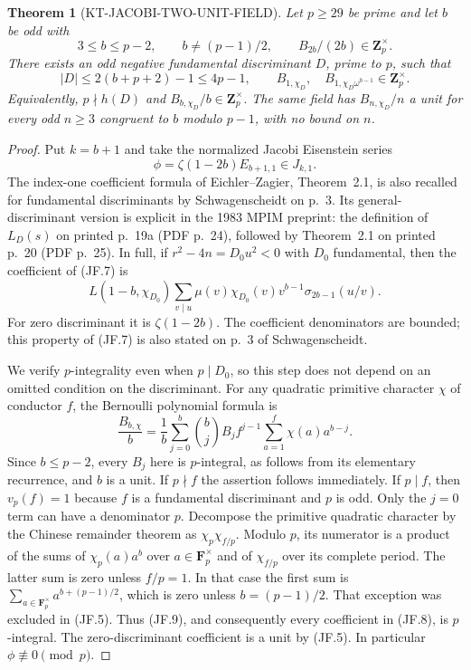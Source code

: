 \documentclass[11pt,a4paper]{article}
\newtheorem{theorem}{Theorem}[section]
\theoremstyle{definition}
\begin{document}
\begin{theorem}[KT-JACOBI-TWO-UNIT-FIELD]
Let $p\geq29$ be prime and let $b$ be odd with
\[
 3\leq b\leq p-2,\qquad b\ne(p-1)/2,
 \qquad B_{2b}/(2b)\in\mathbf Z_p^\times.               \tag{JF.5}
\]
There exists an odd negative fundamental discriminant $D$, prime to
$p$, such that
\[
 |D|\leq2(b+p+2)-1\leq4p-1,\qquad
 B_{1,\chi_D},\quad B_{1,\chi_D\omega^{b-1}}
                      \in\mathbf Z_p^\times.           \tag{JF.6}
\]
Equivalently, $p\nmid h(D)$ and
$B_{b,\chi_D}/b\in\mathbf Z_p^\times$.
The same field has $B_{n,\chi_D}/n$ a unit for every odd $n\geq3$
congruent to $b$ modulo $p-1$, with no bound on $n$.
\end{theorem}
\begin{proof}
Put $k=b+1$ and take the normalized Jacobi Eisenstein series
\[
                \phi=\zeta(1-2b)E_{b+1,1}\in J_{k,1}.
                                                               \tag{JF.7}
\]
The index-one coefficient formula of Eichler--Zagier, Theorem~2.1,
is also recalled for fundamental discriminants by Schwagenscheidt
on p.~3.  Its general-discriminant version is explicit in the
1983 MPIM preprint: the definition of $L_D(s)$ on printed p.~19a
(PDF p.~24), followed by Theorem~2.1 on printed p.~20 (PDF p.~25).
In full, if $r^2-4n=D_0u^2<0$ with $D_0$ fundamental,
then the coefficient of (JF.7) is
\[
 L(1-b,\chi_{D_0})
 \sum_{v\mid u}\mu(v)\chi_{D_0}(v)v^{b-1}
                      \sigma_{2b-1}(u/v).               \tag{JF.8}
\]
For zero discriminant it is $\zeta(1-2b)$.
The coefficient denominators are bounded; this property of (JF.7)
is also stated on p.~3 of Schwagenscheidt.

We verify $p$-integrality even when $p\mid D_0$, so this step does
not depend on an omitted condition on the discriminant.  For any
quadratic primitive character $\chi$ of conductor $f$, the Bernoulli
polynomial formula is
\[
 \frac{B_{b,\chi}}b
 =\frac1b\sum_{j=0}^{b}\binom bj B_j f^{j-1}
                     \sum_{a=1}^{f}\chi(a)a^{b-j}.       \tag{JF.9}
\]
Since $b\leq p-2$, every $B_j$ here is $p$-integral, as follows
from its elementary recurrence, and $b$ is a unit.  If $p\nmid f$
the assertion follows immediately.  If $p\mid f$, then $v_p(f)=1$
because $f$ is a fundamental discriminant and $p$ is odd.
Only the $j=0$ term can have a denominator $p$.  Decompose the
primitive quadratic character by the Chinese remainder theorem
as $\chi_p\chi_{f/p}$.  Modulo $p$, its numerator is a product
of the sums of $\chi_p(a)a^b$ over $a\in\mathbf F_p^\times$
and of $\chi_{f/p}$ over its complete period.  The latter sum is
zero unless $f/p=1$.  In that case the first sum is
$\sum_{a\in\mathbf F_p^\times}a^{b+(p-1)/2}$, which is zero
unless $b=(p-1)/2$.  That exception was excluded in (JF.5).
Thus (JF.9), and consequently every coefficient in (JF.8), is
$p$-integral.  The zero-discriminant coefficient is a unit by (JF.5).
In particular $\phi\not\equiv0\pmod p$.


\end{proof}
\end{document}

